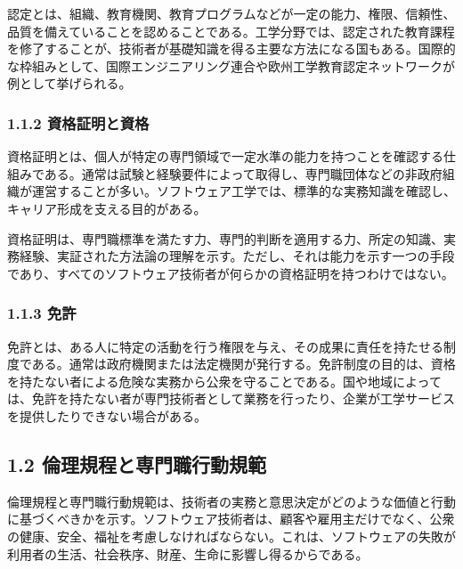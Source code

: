 \documentclass[uplatex,dvipdfmx,a4paper,11pt]{jsarticle}
\begin{document}

認定とは、組織、教育機関、教育プログラムなどが一定の能力、権限、信頼性、品質を備えていることを認めることである。工学分野では、認定された教育課程を修了することが、技術者が基礎知識を得る主要な方法になる国もある。国際的な枠組みとして、国際エンジニアリング連合や欧州工学教育認定ネットワークが例として挙げられる。

\subsubsection*{1.1.2 資格証明と資格}


資格証明とは、個人が特定の専門領域で一定水準の能力を持つことを確認する仕組みである。通常は試験と経験要件によって取得し、専門職団体などの非政府組織が運営することが多い。ソフトウェア工学では、標準的な実務知識を確認し、キャリア形成を支える目的がある。

資格証明は、専門職標準を満たす力、専門的判断を適用する力、所定の知識、実務経験、実証された方法論の理解を示す。ただし、それは能力を示す一つの手段であり、すべてのソフトウェア技術者が何らかの資格証明を持つわけではない。

\subsubsection*{1.1.3 免許}


免許とは、ある人に特定の活動を行う権限を与え、その成果に責任を持たせる制度である。通常は政府機関または法定機関が発行する。免許制度の目的は、資格を持たない者による危険な実務から公衆を守ることである。国や地域によっては、免許を持たない者が専門技術者として業務を行ったり、企業が工学サービスを提供したりできない場合がある。

\subsection*{1.2 倫理規程と専門職行動規範}


倫理規程と専門職行動規範は、技術者の実務と意思決定がどのような価値と行動に基づくべきかを示す。ソフトウェア技術者は、顧客や雇用主だけでなく、公衆の健康、安全、福祉を考慮しなければならない。これは、ソフトウェアの失敗が利用者の生活、社会秩序、財産、生命に影響し得るからである。
\end{document}
